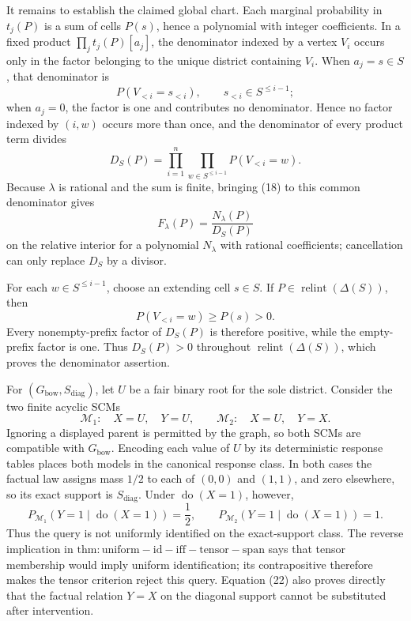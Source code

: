 It remains to establish the claimed global chart.  Each marginal probability in \(t_j(P)\) is a sum of cells \(P(s)\), hence a polynomial with integer coefficients.  In a fixed product \(\prod_jt_j(P)[a_j]\), the denominator indexed by a vertex \(V_i\) occurs only in the factor belonging to the unique district containing \(V_i\).  When \(a_j=s\in S\), that denominator is
\[
P(V_{<i}=s_{<i}),
\qquad s_{<i}\in S^{\le i-1};
\]
when \(a_j=0\), the factor is one and contributes no denominator.  Hence no factor indexed by \((i,w)\) occurs more than once, and the denominator of every product term divides
\[
D_S(P)=\prod_{i=1}^n\prod_{w\in S^{\le i-1}}P(V_{<i}=w).
\]
Because \(\lambda\) is rational and the sum is finite, bringing (18) to this common denominator gives
\[
F_\lambda(P)=\frac{N_\lambda(P)}{D_S(P)}                     \tag{19}
\]
on the relative interior for a polynomial \(N_\lambda\) with rational coefficients; cancellation can only replace \(D_S\) by a divisor.

For each \(w\in S^{\le i-1}\), choose an extending cell \(s\in S\).  If \(P\in\operatorname{relint}(\Delta(S))\), then
\[
P(V_{<i}=w)\ge P(s)>0.                                       \tag{20}
\]
Every nonempty-prefix factor of \(D_S(P)\) is therefore positive, while the empty-prefix factor is one.  Thus \(D_S(P)>0\) throughout \(\operatorname{relint}(\Delta(S))\), which proves the denominator assertion.

For \((G_{\mathrm{bow}},S_{\mathrm{diag}})\), let \(U\) be a fair binary root for the sole district.  Consider the two finite acyclic SCMs
\[
\mathcal M_1:\quad X=U,\quad Y=U,
\qquad
\mathcal M_2:\quad X=U,\quad Y=X.                            \tag{21}
\]
Ignoring a displayed parent is permitted by the graph, so both SCMs are compatible with \(G_{\mathrm{bow}}\).  Encoding each value of \(U\) by its deterministic response tables places both models in the canonical response class.  In both cases the factual law assigns mass \(1/2\) to each of \((0,0)\) and \((1,1)\), and zero elsewhere, so its exact support is \(S_{\mathrm{diag}}\).  Under \(\operatorname{do}(X=1)\), however,
\[
P_{\mathcal M_1}(Y=1\mid\operatorname{do}(X=1))=\frac12,
\qquad
P_{\mathcal M_2}(Y=1\mid\operatorname{do}(X=1))=1.           \tag{22}
\]
Thus the query is not uniformly identified on the exact-support class.  The reverse implication in \(\mathrm{thm:uniform-id-iff-tensor-span}\) says that tensor membership would imply uniform identification; its contrapositive therefore makes the tensor criterion reject this query.  Equation (22) also proves directly that the factual relation \(Y=X\) on the diagonal support cannot be substituted after intervention.


